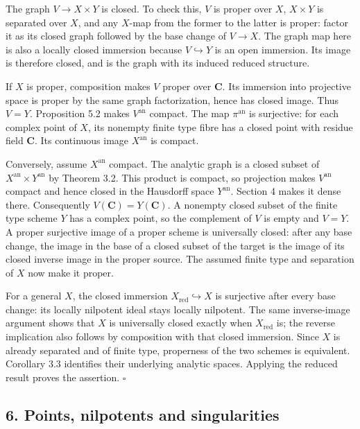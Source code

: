 \documentclass[11pt]{article}
\begin{document}
The graph \(V\to X\times Y\) is closed. To check this, \(V\) is proper
over \(X\), \(X\times Y\) is separated over \(X\), and any \(X\)-map
from the former to the latter is proper: factor it as its closed graph
followed by the base change of \(V\to X\). The graph map here is also a
locally closed immersion because \(V\hookrightarrow Y\) is an open
immersion. Its image is therefore closed, and is the graph with its
induced reduced structure.

If \(X\) is proper, composition makes \(V\) proper over \(\mathbf C\).
Its immersion into projective space is proper by the same graph
factorization, hence has closed image. Thus \(V=Y\). Proposition 5.2
makes \(V^{\mathrm{an}}\) compact. The map \(\pi^{\mathrm{an}}\) is
surjective: for each complex point of \(X\), its nonempty finite type
fibre has a closed point with residue field \(\mathbf C\). Its
continuous image \(X^{\mathrm{an}}\) is compact.

Conversely, assume \(X^{\mathrm{an}}\) compact. The analytic graph is a
closed subset of \(X^{\mathrm{an}}\times Y^{\mathrm{an}}\) by Theorem
3.2. This product is compact, so projection makes \(V^{\mathrm{an}}\)
compact and hence closed in the Hausdorff space \(Y^{\mathrm{an}}\).
Section 4 makes it dense there. Consequently
\(V(\mathbf C)=Y(\mathbf C)\). A nonempty closed subset of the finite
type scheme \(Y\) has a complex point, so the complement of \(V\) is
empty and \(V=Y\). A proper surjective image of a proper scheme is
universally closed: after any base change, the image in the base of a
closed subset of the target is the image of its closed inverse image in
the proper source. The assumed finite type and separation of \(X\) now
make it proper.

For a general \(X\), the closed immersion
\(X_{\mathrm{red}}\hookrightarrow X\) is surjective after every base
change: its locally nilpotent ideal stays locally nilpotent. The same
inverse-image argument shows that \(X\) is universally closed exactly
when \(X_{\mathrm{red}}\) is; the reverse implication also follows by
composition with that closed immersion. Since \(X\) is already separated
and of finite type, properness of the two schemes is equivalent.
Corollary 3.3 identifies their underlying analytic spaces. Applying the
reduced result proves the assertion. \(\square\)

\subsection{6. Points, nilpotents and
singularities}\label{points-nilpotents-and-singularities}
\end{document}
